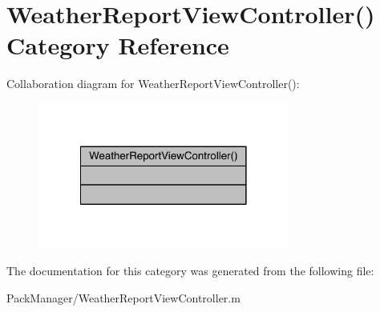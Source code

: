 \hypertarget{category_weather_report_view_controller_07_08}{\section{Weather\-Report\-View\-Controller() Category Reference}
\label{category_weather_report_view_controller_07_08}
}


Collaboration diagram for Weather\-Report\-View\-Controller()\-:\nopagebreak
\begin{figure}[H]
\begin{center}
\leavevmode
\includegraphics[width=234pt]{category_weather_report_view_controller_07_08__coll__graph}
\end{center}
\end{figure}


The documentation for this category was generated from the following file\-:\begin{DoxyCompactItemize}
\item 
Pack\-Manager/Weather\-Report\-View\-Controller.\-m\end{DoxyCompactItemize}
